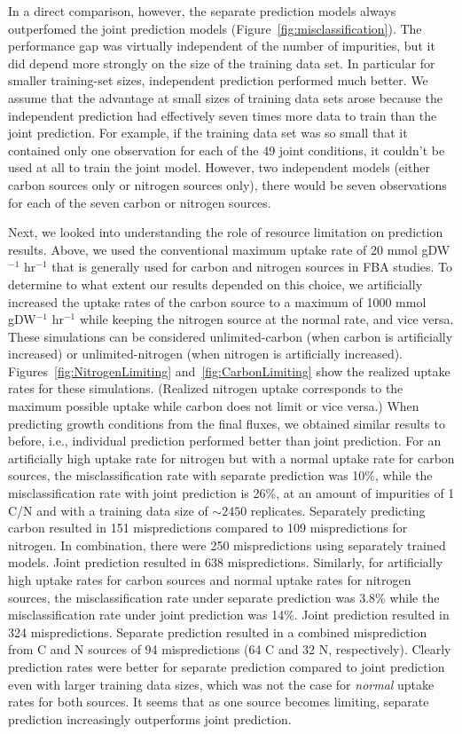 \documentclass[12pt]{article}
\begin{document}
In a direct comparison, however, the separate prediction models always outperfomed the joint prediction models (Figure~\ref{fig:misclassification}). The performance gap was virtually independent of the number of impurities, but it did depend more strongly on the size of the training data set. In particular for smaller training-set sizes, independent prediction performed much better. We assume that the advantage at small sizes of training data sets arose because the independent prediction had effectively seven times more data to train than the joint prediction. For example, if the training data set was so small that it contained only one observation for each of the 49 joint conditions, it couldn't be used at all to train the joint model. However, two independent models (either carbon sources only or nitrogen sources only), there would be seven observations for each of the seven carbon or nitrogen sources.

Next, we looked into understanding the role of resource limitation on prediction results. Above, we used the conventional maximum uptake rate of 20 mmol gDW$^{-1}$ hr$^{-1}$ that is generally used for carbon and nitrogen sources in FBA studies. To determine to what extent our results depended on this choice, we artificially increased the uptake rates of the carbon source to a maximum of 1000 mmol gDW$^{-1}$ hr$^{-1}$ while keeping the nitrogen source at the normal rate, and vice versa. These simulations can be considered unlimited-carbon (when carbon is artificially increased) or unlimited-nitrogen (when nitrogen is artificially increased). Figures~\ref{fig:NitrogenLimiting} and~\ref{fig:CarbonLimiting} show the realized uptake rates for these simulations. (Realized nitrogen uptake corresponds to the maximum possible uptake while carbon does not limit or vice versa.) When predicting growth conditions from the final fluxes, we obtained similar results to before, i.e., individual prediction performed better than joint prediction. For an artificially high uptake rate for nitrogen but with a normal uptake rate for carbon sources, the misclassification rate with separate prediction was 10\%, while the  misclassification rate with joint prediction is 26\%, at an amount of impurities of 1 C/N and with a training data size of $\mathord{\sim}2450$ replicates. Separately predicting carbon resulted in 151 mispredictions compared to 109 mispredictions for nitrogen. In combination, there were 250 mispredictions using separately trained models. Joint prediction resulted in 638 mispredictions. Similarly, for artificially high uptake rates for carbon sources and normal uptake rates for nitrogen sources, the misclassification rate under separate prediction was 3.8\% while the misclassification rate under joint prediction was 14\%. Joint prediction resulted in 324 mispredictions. Separate prediction resulted in a combined misprediction from C and N sources of 94 mispredictions (64 C and 32 N, respectively). Clearly prediction rates were better for separate prediction compared to joint prediction even with larger training data sizes, which was not the case for \emph{normal} uptake rates for both sources. It seems that as one source becomes limiting, separate prediction increasingly outperforms joint prediction.
\end{document}
